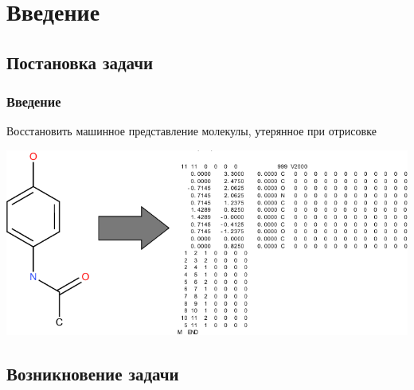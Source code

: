 



\thispagestyle{empty}

\begin{frame}
  \maketitle
 \end{frame}

\setcounter{page}{1}

\section{Введение}
\subsection{Постановка задачи}

\begin{frame}
  \frametitle{Введение}
  \begin{defn}
     Восстановить машинное представление молекулы, утерянное при отрисовке
  \end{defn}
  \begin{center}
  \includegraphics[scale=0.8]{media/parac.pdf}
  \end{center}
\end{frame}

\subsection{Возникновение задачи}

